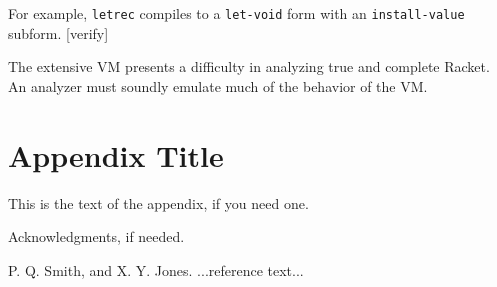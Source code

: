 \documentclass[preprint]{sigplanconf}
\begin{document}
For example, \texttt{letrec} compiles to a \texttt{let-void} form with an \texttt{install-value} subform. [verify]

The extensive VM presents a difficulty in analyzing true and complete Racket. An analyzer must soundly emulate much of the behavior of the VM. 

\appendix
\section{Appendix Title}

This is the text of the appendix, if you need one.

\acks

Acknowledgments, if needed.





\begin{thebibliography}{}
\softraggedright

P. Q. Smith, and X. Y. Jones. ...reference text...

\end{thebibliography}
\end{document}
